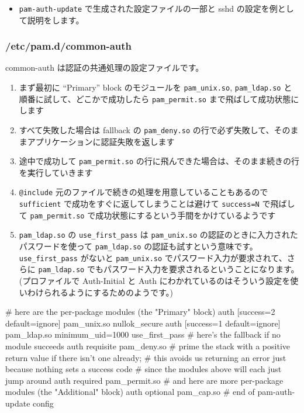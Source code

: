 \documentclass[mingoth,a4paper]{jsarticle}
\begin{document}
\begin{itemize}
\item \verb~pam-auth-update~ で生成された設定ファイルの一部と sshd の設定を例として説明をします。
\end{itemize}
\subsubsection{/etc/pam.d/common-auth}
\label{sec-1-6-1}

common-auth は認証の共通処理の設定ファイルです。
\begin{enumerate}
\item まず最初に ``Primary'' block のモジュールを \verb~pam_unix.so~, \verb~pam_ldap.so~ と順番に試して、どこかで成功したら \verb~pam_permit.so~ まで飛ばして成功状態にします
\item すべて失敗した場合は fallback の \verb~pam_deny.so~ の行で必ず失敗して、そのままアプリケーションに認証失敗を返します
\item 途中で成功して \verb~pam_permit.so~ の行に飛んできた場合は、そのまま続きの行を実行していきます
\item \verb~@include~ 元のファイルで続きの処理を用意していることもあるので \verb~sufficient~ で成功をすぐに返してしまうことは避けて \verb~success=N~ で飛ばして \verb~pam_permit.so~ で成功状態にするという手間をかけているようです
\item \verb~pam_ldap.so~ の \verb~use_first_pass~ は \verb~pam_unix.so~ の認証のときに入力されたパスワードを使って \verb~pam_ldap.so~ の認証も試すという意味です。 \verb~use_first_pass~ がないと \verb~pam_unix.so~ でパスワード入力が要求されて、さらに \verb~pam_ldap.so~ でもパスワード入力を要求されるということになります。(プロファイルで Auth-Initial と Auth にわかれているのはそういう設定を使いわけられるようにするためのようです。)
\end{enumerate}

\begin{commandline}
# here are the per-package modules (the "Primary" block)
auth    [success=2 default=ignore]      pam_unix.so nullok_secure
auth    [success=1 default=ignore]      pam_ldap.so minimum_uid=1000 use_first_pass
# here's the fallback if no module succeeds
auth    requisite                       pam_deny.so
# prime the stack with a positive return value if there isn't one already;
# this avoids us returning an error just because nothing sets a success code
# since the modules above will each just jump around
auth    required                        pam_permit.so
# and here are more per-package modules (the "Additional" block)
auth    optional                        pam_cap.so
# end of pam-auth-update config
\end{commandline}
\end{document}
